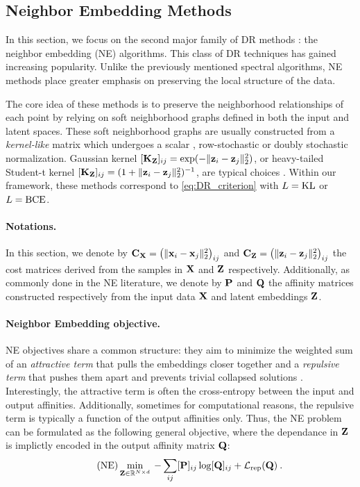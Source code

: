 \subsection{Neighbor Embedding Methods}\label{sec:neighbor_embedding}

In this section, we focus on the second major family of DR methods : the neighbor embedding (NE) algorithms. This class of DR techniques has gained increasing popularity. Unlike the previously mentioned spectral algorithms, NE methods place greater emphasis on preserving the local structure of the data.

The core idea of these methods is to preserve the neighborhood relationships of each point by relying on soft neighborhood graphs defined in both the input and latent spaces. These soft neighborhood graphs are usually constructed from a \emph{kernel-like} matrix which undergoes a scalar \citep{van2008visualizing}, row-stochastic \citep{hinton2002stochastic} or doubly stochastic \citep{lu2019doubly,van2023snekhorn} normalization. Gaussian kernel $[{\mathbf{K}}_{\mathbf{Z}}]_{ij} = \exp(-\|{\mathbf{z}}_i-{\mathbf{z}}_j\|_2^2)$, or heavy-tailed Student-t kernel $[{\mathbf{K}}_{\mathbf{Z}}]_{ij} = (1+\|{\mathbf{z}}_i-{\mathbf{z}}_j\|_2^2)^{-1}$, are typical choices \citep{van2008visualizing}.
Within our framework, these methods correspond to \cref{eq:DR_criterion} with $L = \operatorname{KL}$ or $L=\operatorname{BCE}$.

\paragraph{Notations.}
In this section, we denote by $\mathbf{C}_{\mathbf{X}} = \left(\|{\mathbf{x}}_{i}-{\mathbf{x}}_{j}\|_2^2\right)_{ij}$ and $\mathbf{C}_{\mathbf{Z}} = \left(\|{\mathbf{z}}_{i}-{\mathbf{z}}_{j}\|_2^2\right)_{ij}$ the cost matrices derived from the samples in $\mathbf{X}$ and $\mathbf{Z}$ respectively. Additionally, as commonly done in the NE literature, we denote by ${\mathbf{P}}$ and ${\mathbf{Q}}$ the affinity matrices constructed respectively from the input data ${\mathbf{X}}$ and latent embeddings ${\mathbf{Z}}$.

\paragraph{Neighbor Embedding objective.}
NE objectives share a common structure: they aim to minimize the weighted sum of an \emph{attractive term} that pulls the embeddings closer together and a \emph{repulsive term} that pushes them apart and prevents trivial collapsed solutions \citep{van2022probabilistic}. Interestingly, the attractive term is often the cross-entropy between the input and output affinities. Additionally, sometimes for computational reasons, the repulsive term is typically a function of the output affinities only. Thus, the NE problem can be formulated as the following general objective, where the dependance in ${\mathbf{Z}}$ is implictly encoded in the output affinity matrix ${\mathbf{Q}}$:
\begin{align}\tag{NE}\label{eq:ne_attraction_repulsion}
    \min_{{\mathbf{Z}} \in \mathbb{R}^{N \times d}} \: - \sum_{ij} [{\mathbf{P}}]_{ij} \log [{\mathbf{Q}}]_{ij} + \mathcal{L}_{\mathrm{rep}}({\mathbf{Q}}) \:.
\end{align}

